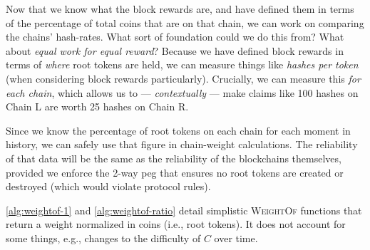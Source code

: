 Now that we know what the block rewards are, and have defined them in
terms of the percentage of total coins that are on that chain, we can
work on comparing the chains' hash-rates. What sort of foundation could
we do this from? What about \emph{equal work for equal reward}? Because
we have defined block rewards in terms of \emph{where} root tokens are
held, we can measure things like \emph{hashes per token} (when
considering block rewards particularly). Crucially, we can measure this
\emph{for each chain}, which allows us to --- \emph{contextually} --- make
claims like 100 hashes on Chain L are worth 25 hashes on Chain R.

Since we know the percentage of root tokens on each chain for each
moment in history, we can safely use that figure in chain-weight
calculations. The reliability of that data will be the same as the
reliability of the blockchains themselves, provided we enforce the 2-way
peg that ensures no root tokens are created or destroyed (which would
violate protocol rules).

\autoref{alg:weightof-1} and \autoref{alg:weightof-ratio} detail
simplistic \textsc{WeightOf} functions that return a weight normalized
in coins (i.e., root tokens). It does not account for some things, e.g.,
changes to the difficulty of \(C\) over time.




